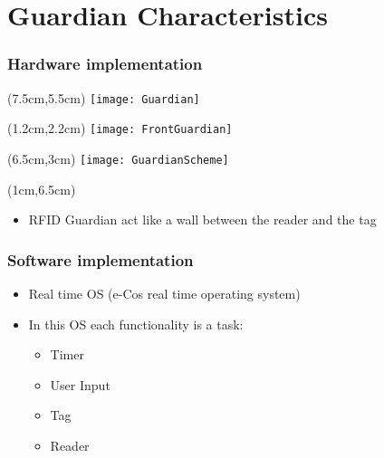\section{Guardian Characteristics}
\begin{frame}
 \frametitle{Hardware implementation}

 \begin{textblock*}{5cm}(7.5cm,5.5cm)
  \texttt{[image: Guardian]}
 \end{textblock*}

 \begin{textblock*}{5cm}(1.2cm,2.2cm)
  \texttt{[image: FrontGuardian]}
 \end{textblock*}

 \begin{textblock*}{5cm}(6.5cm,3cm)
  \texttt{[image: GuardianScheme]}
 \end{textblock*}

 \begin{textblock*}{5cm}(1cm,6.5cm)
  \begin{itemize}
   \item RFID Guardian act like a wall between the reader and the tag
  \end{itemize}
 \end{textblock*}

\end{frame}

\begin{frame}
 \frametitle{Software implementation}

 \begin{itemize}
  \item Real time OS (e-Cos real time operating system)
  \item In this OS each functionality is a task:
  \begin{itemize}
   \item Timer
   \item User Input
   \item Tag
   \item Reader
  \end{itemize}

 \end{itemize}


\end{frame}
